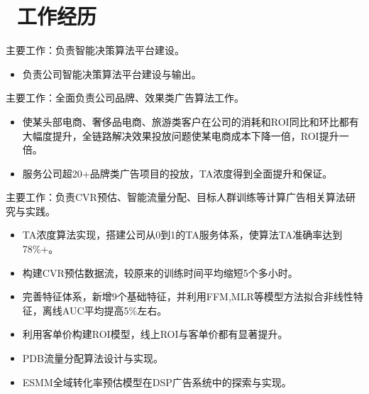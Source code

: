 \documentclass{resume}
\begin{document}



\section{\faUsers\ 工作经历}
\begin{onehalfspacing}
主要工作：负责智能决策算法平台建设。
\begin{itemize}
\item  负责公司智能决策算法平台建设与输出。
\end{itemize}
\end{onehalfspacing}

\begin{onehalfspacing}
主要工作：全面负责公司品牌、效果类广告算法工作。
\begin{itemize}
\item 使某头部电商、奢侈品电商、旅游类客户在公司的消耗和ROI同比和环比都有大幅度提升，全链路解决效果投放问题使某电商成本下降一倍，ROI提升一倍。
\item 服务公司超20+品牌类广告项目的投放，TA浓度得到全面提升和保证。
\end{itemize}
\end{onehalfspacing}

\begin{onehalfspacing}
主要工作：负责CVR预估、智能流量分配、目标人群训练等计算广告相关算法研究与实践。
\begin{itemize}
\item TA浓度算法实现，搭建公司从0到1的TA服务体系，使算法TA准确率达到78\%+。 
\item 构建CVR预估数据流，较原来的训练时间平均缩短5个多小时。
\item 完善特征体系，新增9个基础特征，并利用FFM,MLR等模型方法拟合非线性特征，离线AUC平均提高5\%左右。
\item 利用客单价构建ROI模型，线上ROI与客单价都有显著提升。
\item PDB流量分配算法设计与实现。 
\item ESMM全域转化率预估模型在DSP广告系统中的探索与实现。
\end{itemize}
\end{onehalfspacing}
\end{document}
